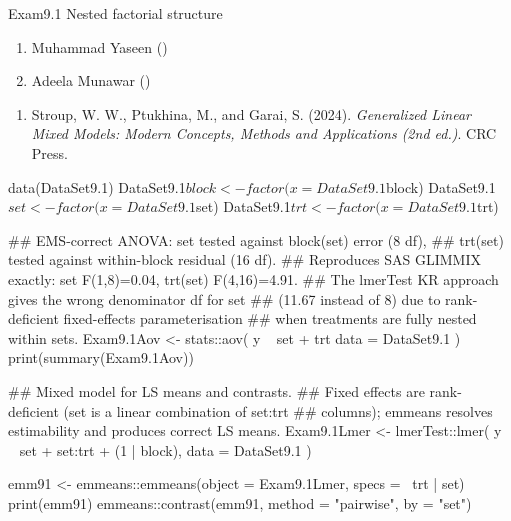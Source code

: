 \documentclass[a4paper]{book}
\begin{document}
%
\begin{Description}
Exam9.1 Nested factorial structure
\end{Description}
%
\begin{Author}
\begin{enumerate}

\item{}  Muhammad Yaseen ()
\item{} Adeela Munawar ()

\end{enumerate}

\end{Author}
%
\begin{References}
\begin{enumerate}

\item{} Stroup, W. W., Ptukhina, M., and Garai, S. (2024).
\emph{Generalized Linear Mixed Models: Modern Concepts, Methods and Applications (2nd ed.)}.
CRC Press.

\end{enumerate}

\end{References}
%
\begin{SeeAlso}
\end{SeeAlso}
%
\begin{Examples}
\begin{ExampleCode}

data(DataSet9.1)
DataSet9.1$block <- factor(x = DataSet9.1$block)
DataSet9.1$set   <- factor(x = DataSet9.1$set)
DataSet9.1$trt   <- factor(x = DataSet9.1$trt)

## EMS-correct ANOVA: set tested against block(set) error (8 df),
## trt(set) tested against within-block residual (16 df).
## Reproduces SAS GLIMMIX exactly: set F(1,8)=0.04, trt(set) F(4,16)=4.91.
## The lmerTest KR approach gives the wrong denominator df for set
## (11.67 instead of 8) due to rank-deficient fixed-effects parameterisation
## when treatments are fully nested within sets.
Exam9.1Aov <- stats::aov(
  y ~ set + trt %
  data = DataSet9.1
)
print(summary(Exam9.1Aov))

## Mixed model for LS means and contrasts.
## Fixed effects are rank-deficient (set is a linear combination of set:trt
## columns); emmeans resolves estimability and produces correct LS means.
Exam9.1Lmer <- lmerTest::lmer(
  y ~ set + set:trt + (1 | block),
  data = DataSet9.1
)

emm91 <- emmeans::emmeans(object = Exam9.1Lmer, specs = ~trt | set)
print(emm91)
emmeans::contrast(emm91, method = "pairwise", by = "set")

\end{ExampleCode}
\end{Examples}
\end{document}
